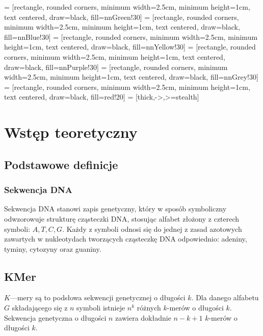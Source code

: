 

 = [rectangle, rounded corners, minimum width=2.5cm, minimum height=1cm, text centered, draw=black, fill=nnGreen!30]
 = [rectangle, rounded corners, minimum width=2.5cm, minimum height=1cm, text centered, draw=black, fill=nnBlue!30]
 = [rectangle, rounded corners, minimum width=2.5cm, minimum height=1cm, text centered, draw=black, fill=nnYellow!30]
 = [rectangle, rounded corners, minimum width=2.5cm, minimum height=1cm, text centered, draw=black, fill=nnPurple!30]
 = [rectangle, rounded corners, minimum width=2.5cm, minimum height=1cm, text centered, draw=black, fill=nnGrey!30]
 = [rectangle, rounded corners, minimum width=2.5cm, minimum height=1cm, text centered, draw=black, fill=red!20]
 = [thick,->,>=stealth]

\clearpage
\section{Wstęp teoretyczny}

    \subsection{Podstawowe definicje}

        \subsubsection{Sekwencja DNA}

            Sekwencja DNA stanowi zapis genetyczny, który w sposób symboliczny odwzorowuje strukturę cząsteczki DNA, stosując alfabet złożony z czterech symboli: $A, T, C, G$. Każdy z symboli odnosi się do jednej z zasad azotowych zawartych w nukleotydach tworzących cząsteczkę DNA odpowiednio: adeniny, tyminy, cytozyny oraz guaniny.

            \subsection{KMer}
        
            $K$—mery są to podsłowa sekwencji genetycznej o długości $k$. Dla danego alfabetu $G$ składającego się z $n$ symboli istnieje $n^k$ różnych $k$-merów o długości $k$. Sekwencja genetyczna o długości $n$ zawiera dokładnie $n - k + 1$ $k$-merów o długości $k$.

